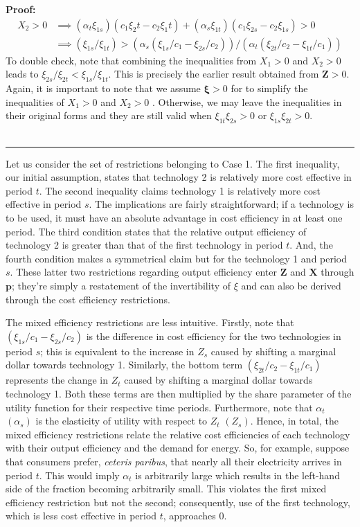 \documentclass[11pt,a4paper,leqno]{extarticle}
\newenvironment{proof}[1][Proof]{\noindent\textbf{#1:} }{\ \rule{0.5em}{0.5em}}
\begin{document}
\begin{proof}
		\begin{align*}
		X_2 > 0 &\implies (\alpha_t \xi_{1s})(c_1 \xi_2t - c_2\xi_1t) + (\alpha_s \xi_{1t})(c_1 \xi_{2s} - c_2 \xi_{1s}) > 0\\
		&\implies (\xi_{1s}/\xi_{1t}) > (\alpha_s (\xi_{1s}/c_1 -  \xi_{2s}/c_2))/(\alpha_t(\xi_{2t}/c_2 - \xi_{1t}/c_1)) 
		\end{align*}
		To double check, note that combining the inequalities from $X_1>0$ and $X_2 > 0$ leads to $\xi_{2s}/\xi_{2t} < \xi_{1s}/\xi_{1t}$. This is precisely the earlier result obtained from $\mathbf{Z} > 0$. Again, it is  important to note that we assume $\boldsymbol{\xi} > 0$ for to simplify the inequalities of $X_1 > 0$ and $X_2 > 0$ . Otherwise, we may leave the inequalities in their original forms and they are still valid when  $\xi_{1t} \xi_{2s} > 0$ or $\xi_{1s} \xi_{2t} > 0$.   \\ \hfill
	\end{proof}
	
	Let us consider the set of restrictions belonging to Case 1. The first inequality, our initial assumption, states that technology 2 is relatively more cost effective in period $t$. The second inequality claims technology 1 is relatively more cost effective in period $s$. The implications are fairly straightforward; if a technology is to be used, it must have an absolute advantage in cost efficiency in at least one period. The third condition states that the relative output efficiency of technology 2 is greater than that of the first technology in period $t$. And, the fourth condition makes a symmetrical claim but for the technology 1 and period $s$. These latter two restrictions regarding output efficiency enter $\mathbf{Z}$ and $\mathbf{X}$ through $\mathbf{p}$; they're simply a restatement of the invertibility of $\xi$ and can also be derived through the cost efficiency restrictions. 
	
	The mixed efficiency restrictions are less intuitive. Firstly, note that $\left(\xi_{1s}/c_1 - \xi_{2s}/c_2\right)$ is the difference in cost efficiency for the two technologies in period $s$; this is equivalent to the increase in $Z_s$ caused by shifting a marginal dollar towards technology 1. Similarly, the bottom term $\left( \xi_{2t}/c_2 - \xi_{1t}/c_1 \right)$ represents the change in $Z_t$ caused by shifting a marginal dollar towards technology 1. Both these terms are then multiplied by the share parameter of the utility function for their respective time periods. Furthermore, note that $\alpha_t$ $(\alpha_s)$ is the elasticity of utility with respect to $Z_t$ $(Z_s)$. Hence, in total, the mixed efficiency restrictions relate the relative cost efficiencies of each technology with their output efficiency and the demand for energy. So, for example, suppose that consumers prefer, \textit{ceteris paribus}, that nearly all their electricity arrives in period $t$. This would imply $\alpha_t$ is arbitrarily large which results in the left-hand side of the fraction becoming arbitrarily small. This violates the first mixed efficiency restriction but not the second; consequently, use of the first technology, which is less cost effective in period $t$, approaches $0$. 
	
\end{document}
